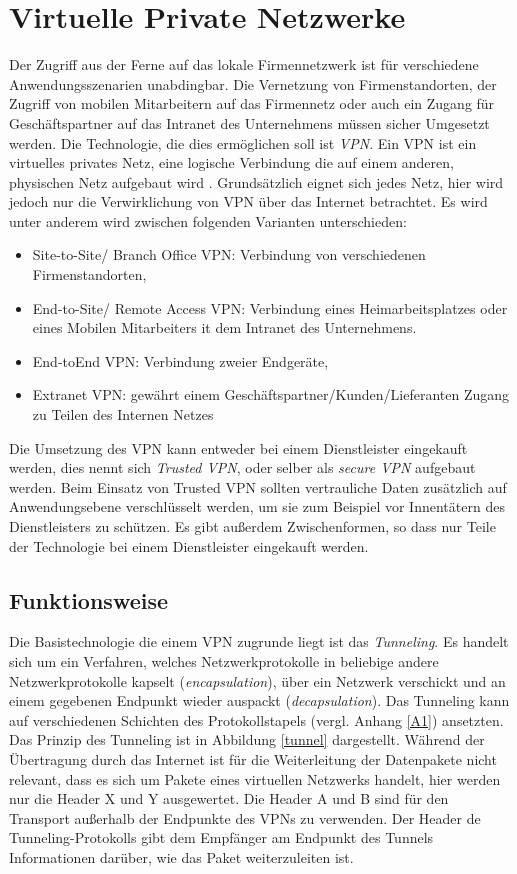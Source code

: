 \chapter{Virtuelle Private Netzwerke}

Der Zugriff aus der Ferne auf das lokale Firmennetzwerk ist für verschiedene Anwendungsszenarien unabdingbar. Die Vernetzung von Firmenstandorten, der Zugriff von mobilen Mitarbeitern auf das Firmennetz oder auch ein Zugang für Geschäftspartner auf das Intranet des Unternehmens müssen sicher Umgesetzt werden.
Die Technologie, die dies ermöglichen soll ist \emph{VPN}. Ein VPN ist ein virtuelles privates Netz, eine logische Verbindung die auf einem anderen, physischen Netz aufgebaut wird \cite{zisler2018computer}. Grundsätzlich eignet sich jedes Netz, hier wird jedoch nur die Verwirklichung von VPN über das Internet betrachtet. Es wird unter anderem wird zwischen folgenden Varianten unterschieden:
\begin{itemize}
  \item Site-to-Site/ Branch Office VPN: Verbindung von verschiedenen Firmenstandorten,
  \item End-to-Site/ Remote Access VPN: Verbindung eines Heimarbeitsplatzes oder eines Mobilen Mitarbeiters it dem Intranet des Unternehmens.
  \item End-toEnd VPN: Verbindung zweier Endgeräte,
  \item Extranet VPN: gewährt einem Geschäftspartner/Kunden/Lieferanten Zugang zu Teilen des Internen Netzes 
\end{itemize}

Die Umsetzung des VPN kann entweder bei einem Dienstleister eingekauft werden, dies nennt sich \emph{Trusted VPN}, oder selber als \emph{secure VPN} aufgebaut werden. Beim Einsatz von Trusted VPN sollten vertrauliche Daten zusätzlich auf Anwendungsebene verschlüsselt werden, um sie zum Beispiel vor Innentätern des Dienstleisters zu schützen. 
 Es gibt außerdem Zwischenformen, so dass nur Teile der Technologie bei einem Dienstleister eingekauft werden.


\section{Funktionsweise}

Die Basistechnologie die einem VPN zugrunde liegt ist das \emph{Tunneling}. Es handelt sich um ein Verfahren, welches  Netzwerkprotokolle in beliebige andere Netzwerkprotokolle kapselt (\emph{encapsulation}), über ein Netzwerk verschickt und an einem gegebenen Endpunkt wieder auspackt (\emph{decapsulation}). Das Tunneling kann auf verschiedenen Schichten des Protokollstapels (vergl. Anhang \ref{A1}) ansetzten. Das Prinzip des Tunneling ist in Abbildung \ref{tunnel} dargestellt. Während der Übertragung durch das Internet ist für die Weiterleitung der Datenpakete nicht relevant, dass es sich um Pakete eines virtuellen Netzwerks handelt, hier werden nur die Header X und Y ausgewertet. Die Header A und B sind für den Transport außerhalb der Endpunkte des VPNs zu verwenden. Der Header de Tunneling-Protokolls gibt dem Empfänger am Endpunkt des Tunnels Informationen darüber, wie das Paket weiterzuleiten ist. 

